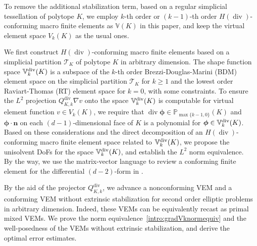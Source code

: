 \documentclass[10pt]{amsart}
\renewcommand{\div}{\operatorname{div}}
\numberwithin{equation}{section}
\begin{document}
To remove the additional stabilization term, based on a regular simplicial tessellation of polytope $K$, we employ $k$-th order or $(k-1)$-th order $H(\div)$-conforming macro finite elements as $\mathbb{V}(K)$ in this paper, and keep the virtual element space $V_k(K)$ as the usual ones.


We first construct $H(\div)$-conforming macro finite elements based on a
simplicial partition $\mathcal T_K$ of polytope $K$ in arbitrary dimension. The
shape function space $\mathbb{V}_{k}^{\rm div}(K)$ is a subspace of the $k$-th
order Brezzi-Douglas-Marini (BDM) element space on the simplicial partition
$\mathcal T_K$ for $k\geq1$ and the lowest order Raviart-Thomas (RT) element
space for $k=0$, with some constraints. To ensure the $L^2$ projection
$Q_{K,k}^{\div}\nabla v$ onto the space $\mathbb{V}_{k}^{\rm div}(K)$ is computable
for virtual element function $v\in V_k(K)$, we require that
$\div\boldsymbol{\phi}\in\mathbb P_{\max\{k-1,0\}}(K)$ and
$\boldsymbol{\phi}\cdot\boldsymbol{n}$ on each $(d-1)$-dimensional face of $K$
is a polynomial for $\boldsymbol{\phi}\in\mathbb{V}_{k}^{\rm div}(K)$.  Based on
these considerations and the direct decomposition of an $H(\div)$-conforming
macro finite element space related to $\mathbb{V}_{k}^{\rm div}(K)$, we propose
the unisolvent DoFs for the space $\mathbb{V}_{k}^{\rm div}(K)$, and establish the
$L^2$ norm equivalence.  By the way, we use the matrix-vector language to review
a conforming finite element for the differential $(d-2)$-form in
\cite{ArnoldFalkWinther2006,Arnold2018}. 









By the aid of the projector $Q_{K,k}^{\div}$, we advance a nonconforming VEM and a conforming VEM without extrinsic stabilization for second order elliptic problems in arbitrary dimension.
Indeed, these VEMs can be equivalently recast as
primal mixed VEMs.
We prove the norm equivalence~\eqref{intro:gradVknormequiv} and the well-posedness of the VEMs without extrinsic stabilization, and derive the optimal error estimates. 
\end{document}
